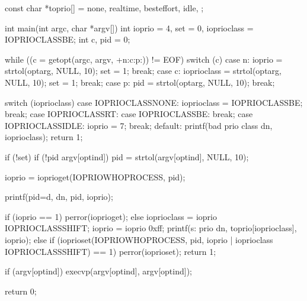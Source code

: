 \documentclass[a4paper,11pt,english]{sphinxmanual}
\begin{document}
\begin{sphinxVerbatim}[commandchars=\\\{\}]
const char *to\PYGZus{}prio[] = \PYGZob{} \PYGZdq{}none\PYGZdq{}, \PYGZdq{}realtime\PYGZdq{}, \PYGZdq{}best\PYGZhy{}effort\PYGZdq{}, \PYGZdq{}idle\PYGZdq{}, \PYGZcb{};

int main(int argc, char *argv[])
\PYGZob{}
      int ioprio = 4, set = 0, ioprio\PYGZus{}class = IOPRIO\PYGZus{}CLASS\PYGZus{}BE;
      int c, pid = 0;

      while ((c = getopt(argc, argv, \PYGZdq{}+n:c:p:\PYGZdq{})) != EOF) \PYGZob{}
              switch (c) \PYGZob{}
              case \PYGZsq{}n\PYGZsq{}:
                      ioprio = strtol(optarg, NULL, 10);
                      set = 1;
                      break;
              case \PYGZsq{}c\PYGZsq{}:
                      ioprio\PYGZus{}class = strtol(optarg, NULL, 10);
                      set = 1;
                      break;
              case \PYGZsq{}p\PYGZsq{}:
                      pid = strtol(optarg, NULL, 10);
                      break;
              \PYGZcb{}
      \PYGZcb{}

      switch (ioprio\PYGZus{}class) \PYGZob{}
              case IOPRIO\PYGZus{}CLASS\PYGZus{}NONE:
                      ioprio\PYGZus{}class = IOPRIO\PYGZus{}CLASS\PYGZus{}BE;
                      break;
              case IOPRIO\PYGZus{}CLASS\PYGZus{}RT:
              case IOPRIO\PYGZus{}CLASS\PYGZus{}BE:
                      break;
              case IOPRIO\PYGZus{}CLASS\PYGZus{}IDLE:
                      ioprio = 7;
                      break;
              default:
                      printf(\PYGZdq{}bad prio class \PYGZpc{}d\PYGZbs{}n\PYGZdq{}, ioprio\PYGZus{}class);
                      return 1;
      \PYGZcb{}

      if (!set) \PYGZob{}
              if (!pid \PYGZam{}\PYGZam{} argv[optind])
                      pid = strtol(argv[optind], NULL, 10);

              ioprio = ioprio\PYGZus{}get(IOPRIO\PYGZus{}WHO\PYGZus{}PROCESS, pid);

              printf(\PYGZdq{}pid=\PYGZpc{}d, \PYGZpc{}d\PYGZbs{}n\PYGZdq{}, pid, ioprio);

              if (ioprio == \PYGZhy{}1)
                      perror(\PYGZdq{}ioprio\PYGZus{}get\PYGZdq{});
              else \PYGZob{}
                      ioprio\PYGZus{}class = ioprio \PYGZgt{}\PYGZgt{} IOPRIO\PYGZus{}CLASS\PYGZus{}SHIFT;
                      ioprio = ioprio \PYGZam{} 0xff;
                      printf(\PYGZdq{}\PYGZpc{}s: prio \PYGZpc{}d\PYGZbs{}n\PYGZdq{}, to\PYGZus{}prio[ioprio\PYGZus{}class], ioprio);
              \PYGZcb{}
      \PYGZcb{} else \PYGZob{}
              if (ioprio\PYGZus{}set(IOPRIO\PYGZus{}WHO\PYGZus{}PROCESS, pid, ioprio | ioprio\PYGZus{}class \PYGZlt{}\PYGZlt{} IOPRIO\PYGZus{}CLASS\PYGZus{}SHIFT) == \PYGZhy{}1) \PYGZob{}
                      perror(\PYGZdq{}ioprio\PYGZus{}set\PYGZdq{});
                      return 1;
              \PYGZcb{}

              if (argv[optind])
                      execvp(argv[optind], \PYGZam{}argv[optind]);
      \PYGZcb{}

      return 0;
\PYGZcb{}
\end{sphinxVerbatim}
\end{document}
